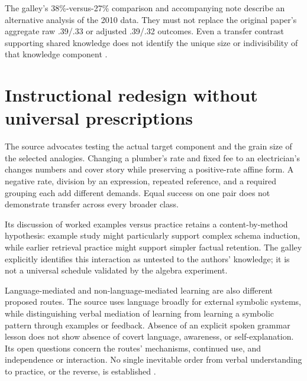 The galley's 38\%-versus-27\% comparison and accompanying note
describe an alternative analysis of the 2010 data. They must not
replace the original paper's aggregate raw .39/.33 or adjusted
.39/.32 outcomes. Even a transfer contrast supporting shared
knowledge does not identify the unique size or indivisibility of
that knowledge component
\cite[galley pp.~710,713 n.~9]{KoedingerRoll2011TransferTypeset}.

\section{Instructional redesign without universal prescriptions}
\label{sec:p19-cta-redesign}

The source advocates testing the actual target component and the
grain size of the selected analogies. Changing a plumber's rate
and fixed fee to an electrician's changes numbers and cover story
while preserving a positive-rate affine form. A negative rate,
division by an expression, repeated reference, and a required
grouping each add different demands. Equal success on one pair
does not demonstrate transfer across every broader class.

Its discussion of worked examples versus practice retains a
content-by-method hypothesis: example study might particularly
support complex schema induction, while earlier retrieval practice
might support simpler factual retention. The galley explicitly
identifies this interaction as untested to the authors' knowledge;
it is not a universal schedule validated by the algebra experiment.

Language-mediated and non-language-mediated learning are also
different proposed routes. The source uses language broadly for
external symbolic systems, while distinguishing verbal mediation
of learning from learning a symbolic pattern through examples or
feedback. Absence of an explicit spoken grammar lesson does not
show absence of covert language, awareness, or self-explanation.
Its open questions concern the routes' mechanisms, continued use,
and independence or interaction. No single inevitable order from
verbal understanding to practice, or the reverse, is established
\cite[galley pp.~705,707--713,nn.~6,10]{KoedingerRoll2011TransferTypeset}.

